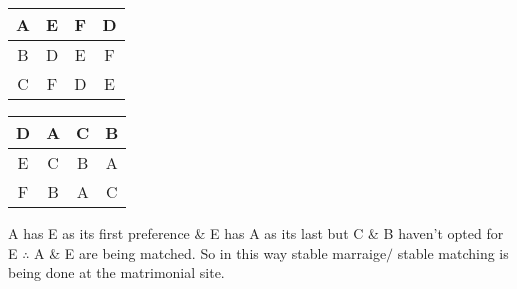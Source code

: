 \documentclass[12pt]{article}
\begin{document}
\begin{enumerate}
\begin{enumerate}
\begin{center}
\begin{tabular}{ |c|c c c| }
 \hline
 A & E & F & D \\ [0.5ex] 
 \hline
 B & D & E & F \\ 
 \hline
 C & F & D & E \\ [1ex] 
 \hline
\end{tabular}
\begin{tabular}{ |c|c c c| } 
 \hline
 D & A & C & B \\ [0.5ex] 
 \hline
 E & C & B & A \\ 
 \hline
 F & B & A & C \\ [1ex] 
 \hline
\end{tabular}
\end{center}
A has E as its first preference \& E has A as its last but C \& B haven't opted for E $\therefore$ A \& E are being matched. So in this way stable marraige$/$ stable matching is being done at the matrimonial site.
\end{enumerate}
\end{enumerate}
\end{document}
